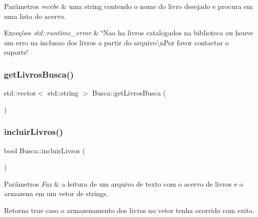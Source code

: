 \begin{DoxyParams}{Parâmetros}
{\em recebe} & uma string contendo o nome do livro desejado e procura em uma lista do acervo. \\
\hline
\end{DoxyParams}

\begin{DoxyExceptions}{Exceções}
{\em std\+::runtime\+\_\+error} & \char`\"{}\+Nao ha livros catalogados na biblioteca ou houve um erro na inclusao dos livros a partir do arquivo\textbackslash{}n\+Por favor contactar o suporte\char`\"{} \\
\hline
\end{DoxyExceptions}
\mbox{\label{class_busca_a5dfb95c0cc9de0a4490fbb56d6cc741f}} 
\subsubsection{\texorpdfstring{getLivrosBusca()}{getLivrosBusca()}}
{\footnotesize\ttfamily std\+::vector$<$ std\+::string $>$ Busca\+::get\+Livros\+Busca (\begin{DoxyParamCaption}{ }\end{DoxyParamCaption})}

\mbox{\label{class_busca_a73eadfa945ab7fa2cf92e4b0c70590bf}} 
\subsubsection{\texorpdfstring{incluirLivros()}{incluirLivros()}}
{\footnotesize\ttfamily bool Busca\+::incluir\+Livros (\begin{DoxyParamCaption}{ }\end{DoxyParamCaption})}


\begin{DoxyParams}{Parâmetros}
{\em Faz} & a leitura de um arquivo de texto com o acervo de livros e o armazena em um vetor de strings. \\
\hline
\end{DoxyParams}
\begin{DoxyReturn}{Retorna}
true caso o armazenamento dos livros no vetor tenha ocorrido com exito. 
\end{DoxyReturn}

